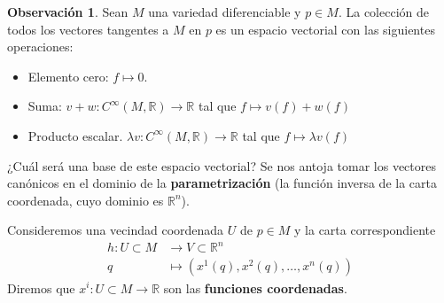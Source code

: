 \documentclass[spanish]{book}
\theoremstyle{definition}
\newtheorem*{obs}{Observación}
\newcommand{\R}{\mathbb{R}}
\begin{document}
\begin{obs}
	Sean $M$ una variedad diferenciable y $p\in M$. La colección de todos los vectores tangentes a $M$ en $p$ es un espacio vectorial con las siguientes operaciones:
	\begin{itemize}
		\item Elemento cero: $f\mapsto0$.
		\item Suma: $v+w:C^\infty(M,\R)\to\R$ tal que $f\mapsto v(f)+w(f)$
		\item Producto escalar. $\lambda v:C^\infty(M,\R)\to\R$ tal que $f\mapsto\lambda v(f)$
	\end{itemize}
\end{obs}
¿Cuál será una base de este espacio vectorial? Se nos antoja tomar los vectores canónicos en el dominio de la \textbf{parametrización} (la función inversa de la carta coordenada, cuyo dominio es $\R^n$).

Consideremos una vecindad coordenada $U$ de $p\in M$ y la carta correspondiente
\begin{align*}
	h:U\subset M&\to V\subset\R^n\\
	q&\mapsto (x^1(q),x^2(q),\ldots,x^n(q))
\end{align*}
Diremos que $x^i:U\subset M\to\R$ son las \textbf{funciones coordenadas}.
\end{document}
